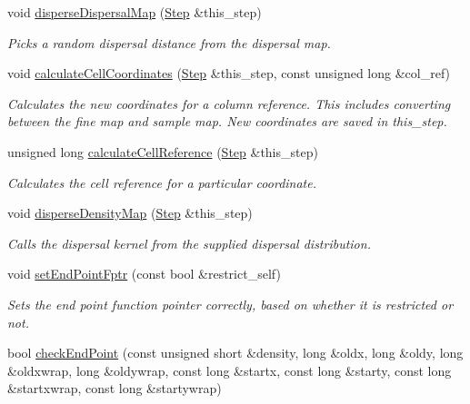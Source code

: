 \begin{DoxyCompactItemize}
void \hyperlink{class_dispersal_coordinator_a6605069356e02d1c130b6d68e5d08483}{disperse\+Dispersal\+Map} (\hyperlink{struct_step}{Step} \&this\+\_\+step)
\begin{DoxyCompactList}\small\item\em Picks a random dispersal distance from the dispersal map. \end{DoxyCompactList}\item 
void \hyperlink{class_dispersal_coordinator_af2a3792c5e0bea86fa044c4cd3e5146c}{calculate\+Cell\+Coordinates} (\hyperlink{struct_step}{Step} \&this\+\_\+step, const unsigned long \&col\+\_\+ref)
\begin{DoxyCompactList}\small\item\em Calculates the new coordinates for a column reference. This includes converting between the fine map and sample map. New coordinates are saved in this\+\_\+step. \end{DoxyCompactList}\item 
unsigned long \hyperlink{class_dispersal_coordinator_a737c7f1a06650b467d06a91c0474fb79}{calculate\+Cell\+Reference} (\hyperlink{struct_step}{Step} \&this\+\_\+step)
\begin{DoxyCompactList}\small\item\em Calculates the cell reference for a particular coordinate. \end{DoxyCompactList}\item 
void \hyperlink{class_dispersal_coordinator_a79b6018cda012a59f7b80de40b394a6a}{disperse\+Density\+Map} (\hyperlink{struct_step}{Step} \&this\+\_\+step)
\begin{DoxyCompactList}\small\item\em Calls the dispersal kernel from the supplied dispersal distribution. \end{DoxyCompactList}\item 
void \hyperlink{class_dispersal_coordinator_ae72980ec66825c641545675037885248}{set\+End\+Point\+Fptr} (const bool \&restrict\+\_\+self)
\begin{DoxyCompactList}\small\item\em Sets the end point function pointer correctly, based on whether it is restricted or not. \end{DoxyCompactList}\item 
bool \hyperlink{class_dispersal_coordinator_a02849acc1783f6115d095b49c2830f03}{check\+End\+Point} (const unsigned short \&density, long \&oldx, long \&oldy, long \&oldxwrap, long \&oldywrap, const long \&startx, const long \&starty, const long \&startxwrap, const long \&startywrap)

\end{DoxyCompactItemize}
